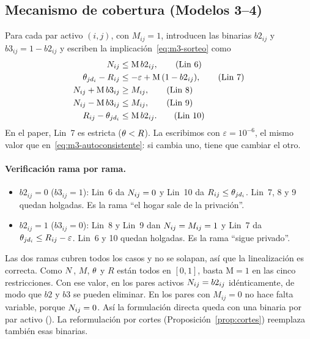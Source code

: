 
\subsection{Mecanismo de cobertura (Modelos 3--4)}

Para cada par activo $(i,j)$, con $M_{ij}=1$, \citet[Apéndice~1]{hamie2024}
introducen las binarias $b2_{ij}$ y $b3_{ij}=1-b2_{ij}$ y escriben la
implicación~\eqref{eq:m3-sorteo} como
\begin{align}
N_{ij} &\le \mathrm{M}\, b2_{ij}, \tag{Lin 6}\\
\theta_{jd_i} - R_{ij} &\le -\varepsilon + \mathrm{M}\,(1-b2_{ij}), \tag{Lin 7}\\
N_{ij} + \mathrm{M}\, b3_{ij} &\ge M_{ij}, \tag{Lin 8}\\
N_{ij} - \mathrm{M}\, b3_{ij} &\le M_{ij}, \tag{Lin 9}\\
R_{ij} - \theta_{jd_i} &\le \mathrm{M}\, b2_{ij}. \tag{Lin 10}
\end{align}
En el paper, Lin~7 es estricta ($\theta<R$). La escribimos con
$\varepsilon=10^{-6}$, el mismo valor que en~\eqref{eq:m3-autoconsistente}: si
cambia uno, tiene que cambiar el otro.

\paragraph{Verificación rama por rama.}
\begin{itemize}
\item $b2_{ij}=0$ ($b3_{ij}=1$): Lin~6 da $N_{ij}=0$ y Lin~10 da
  $R_{ij}\le\theta_{jd_i}$. Lin~7, 8 y 9 quedan holgadas. Es la rama ``el hogar
  sale de la privación''.
\item $b2_{ij}=1$ ($b3_{ij}=0$): Lin~8 y Lin~9 dan $N_{ij}=M_{ij}=1$ y Lin~7
  da $\theta_{jd_i}\le R_{ij}-\varepsilon$. Lin~6 y 10 quedan holgadas. Es la rama
  ``sigue privado''.
\end{itemize}
Las dos ramas cubren todos los casos y no se solapan, así que la linealización
es correcta. Como $N$, $M$, $\theta$ y $R$ están todos en $[0,1]$, basta
$\mathrm{M}=1$ en las cinco restricciones. Con ese valor, en los pares activos
$N_{ij}=b2_{ij}$ idénticamente, de modo que $b2$ y $b3$ se pueden eliminar.
En los pares con $M_{ij}=0$ no hace falta variable, porque $N_{ij}=0$. Así
la formulación directa queda con una binaria por par activo
(\cParesActivos{}). La reformulación por cortes
(Proposición~\ref{prop:cortes}) reemplaza también esas binarias.

